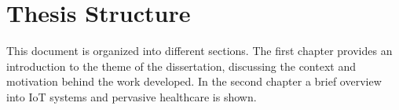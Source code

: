 \section{Thesis Structure}

This document is organized into different sections. The first chapter provides an introduction to the theme of the dissertation, discussing the context and motivation behind the work developed. In the second chapter a brief overview into \acs{IoT} systems and pervasive healthcare is shown.

